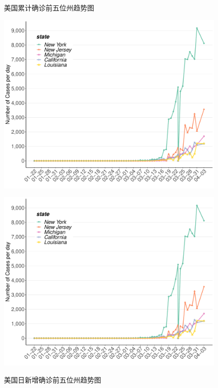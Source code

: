 \documentclass[
]{article}
\begin{document}
\newpage

\begin{figure}[H]
\centering
\begin{minipage}[b]{0.45\linewidth}
\caption{美国累计确诊前五位州趋势图}
\includegraphics[]{./input/covid5.pdf}
\label{}
\end{minipage}
\quad
\begin{minipage}[b]{0.45\linewidth}
\caption{美国⽇新增确诊前五位州趋势图}
\includegraphics[]{./input/covid5.pdf}
\label{}
\end{minipage}
\end{figure}
\end{document}
